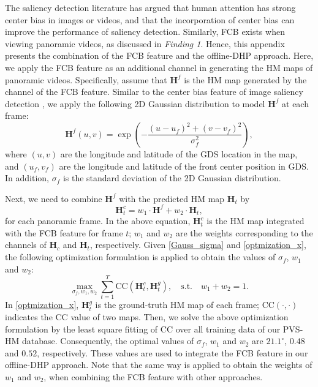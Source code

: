 \documentclass[10pt,journal,compsoc]{IEEEtran}
\begin{document}
The saliency detection literature \cite{judd2009learning} has argued that human attention has strong center bias in images or videos, and that the incorporation of center bias can improve the performance of saliency detection. Similarly, FCB exists when viewing panoramic videos, as discussed in \textit{Finding 1}. Hence, this appendix presents the combination of the FCB feature and the offline-DHP approach. Here, we apply the FCB feature as an additional channel in generating the HM maps of panoramic videos. Specifically, assume that $\mathbf{H}^f$ is the HM map generated by the channel of the FCB feature. Similar to the center bias feature of image saliency detection \cite{judd2009learning}, we apply the following 2D Gaussian distribution to model $\mathbf{H}^f$ at each frame:
\begin{equation}
\label{Gauss_sigma}
\mathbf{H}^f(u,v)= \exp\left({-\frac{(u-u_f)^2+(v-v_f)^2}{\sigma_f^2}}\right),
\end{equation}
where $(u,v)$ are the longitude and latitude of the GDS location in the map, and $(u_f,v_f)$ are the longitude and latitude of the front center position in GDS. In addition, $\sigma_f$ is the standard deviation of  the 2D Gaussian distribution.

Next, we need to combine $\mathbf{H}^f$ with the predicted HM map $\mathbf{H}_t$ by
\begin{equation}
\label{optmization_x}
\mathbf{H}^c_t = w_1\cdot \mathbf{H}^f+w_2\cdot \mathbf{H}_t,
\end{equation}
for each panoramic frame. In the above equation, $\mathbf{H}^c_t$ is the HM map integrated with the FCB feature for frame $t$; $w_1$ and $w_2$ are the weights corresponding to the channels of $\mathbf{H}_c$ and $\mathbf{H}_t$, respectively. Given \eqref{Gauss_sigma} and \eqref{optmization_x}, the following optimization formulation is applied to obtain the values of $\sigma_f$, $w_1$ and $w_2$:
\begin{equation}
\label{optmization_w}
\max_{\sigma_f,w_1,w_2} \sum_{t=1}^{T} \text{CC}(\mathbf{H}^c_t, \mathbf{H}^g_t), \quad \text{s.t.} \quad w_1+w_2=1.
\end{equation}
In \eqref{optmization_x}, $\mathbf{H}^g_t$ is the ground-truth HM map of each frame; $\text{CC}(\cdot,\cdot)$ indicates the CC value of two maps. Then, we solve the above optimization formulation by the least square fitting of CC over all training data of our PVS-HM database. Consequently, the optimal values of $\sigma_f$, $w_1$ and $w_2$ are $21.1^\circ$, $0.48$ and $0.52$, respectively. These values are used to integrate the FCB feature in our offline-DHP approach. Note that the same way is applied to obtain the weights of $w_1$ and $w_2$, when combining the FCB feature with other approaches.
\end{document}
